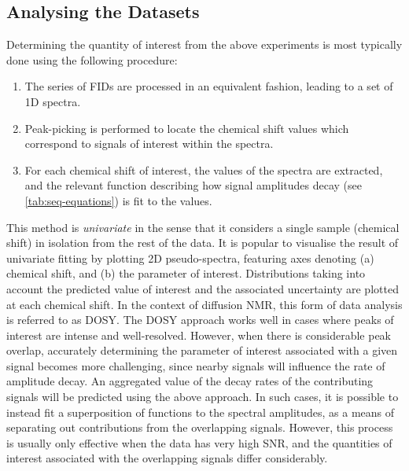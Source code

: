 \subsection{Analysing the Datasets}
Determining the quantity of interest from the above experiments is most
typically done using the following procedure:
\begin{enumerate}
    \item The series of \acp{FID} are processed in an equivalent fashion,
        leading to a set of \ac{1D} spectra.
    \item Peak-picking is performed to locate the chemical shift values which
        correspond to signals of interest within the spectra.
    \item For each chemical shift of interest, the values of the spectra are
        extracted, and the relevant function describing how signal amplitudes
        decay (see \cref{tab:seq-equations}) is fit to the values.
\end{enumerate}
This method is \emph{univariate} in the sense that it considers a single sample
(chemical shift) in isolation from the rest of the data.
It is popular to visualise the result of univariate fitting by plotting \ac{2D}
pseudo-spectra, featuring axes denoting (a) chemical shift, and (b)
the parameter of interest. Distributions taking
into account the predicted value of interest and the associated uncertainty
are plotted at each chemical shift.
In the context of diffusion \ac{NMR}, this form of data analysis is
referred to as \ac{DOSY}\cite{Morris2009b}.
The \ac{DOSY} approach works well in cases where peaks of interest are intense
and well-resolved. However, when there is considerable peak overlap, accurately
determining the parameter of interest associated with a given signal becomes
more challenging, since nearby signals will influence the rate of amplitude
decay. An aggregated value of the decay rates of the contributing signals
will be predicted using the above approach.
In such cases, it is possible to instead fit
a superposition of functions to the spectral amplitudes, as a means of
separating out contributions from the overlapping signals\cite{Nilsson2006}.
However, this process is usually only effective when the data has very high
\ac{SNR}, and the quantities of interest associated with the overlapping
signals differ considerably.

